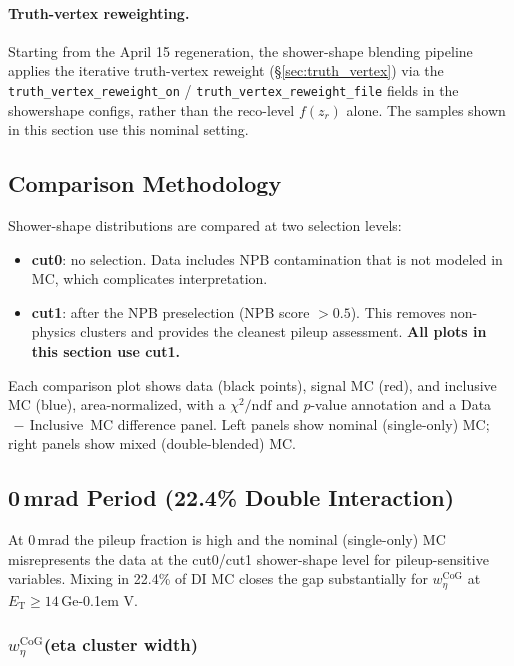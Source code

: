 \documentclass[11pt,a4paper]{article}
\newcommand{\ET}{\ensuremath{E_{\text{T}}}\xspace}
\newcommand{\wetacog}{\ensuremath{w_{\eta}^{\mathrm{CoG}}}\xspace}
\newcommand{\chidf}{\ensuremath{\chi^2/\mathrm{ndf}}\xspace}
\newcommand{\GeV}{\ifmmode {\mathrm{\ Ge\kern -0.1em V}}\else\textrm{Ge\kern -0.1em V}\fi\xspace}
\begin{document}
\paragraph{Truth-vertex reweighting.} Starting from the April 15
regeneration, the shower-shape blending pipeline applies the iterative
truth-vertex reweight (\S\ref{sec:truth_vertex}) via the
\texttt{truth\_vertex\_reweight\_on} / \texttt{truth\_vertex\_reweight\_file}
fields in the showershape configs, rather than the reco-level
$f(z_r)$ alone. The samples shown in this section use this nominal
setting.

\subsection{Comparison Methodology}
\label{subsec:shower_method}

Shower-shape distributions are compared at two selection levels:
\begin{itemize}
\item \textbf{cut0}: no selection. Data includes NPB contamination
  that is not modeled in MC, which complicates interpretation.
\item \textbf{cut1}: after the NPB preselection
  (NPB score $>0.5$). This removes non-physics clusters and provides
  the cleanest pileup assessment. \textbf{All plots in this section
  use cut1.}
\end{itemize}
Each comparison plot shows data (black points), signal MC (red),
and inclusive MC (blue), area-normalized, with a \chidf and $p$-value
annotation and a Data$\,-\,$Inclusive~MC difference panel. Left
panels show nominal (single-only) MC; right panels show mixed
(double-blended) MC.

\subsection{0\,mrad Period (22.4\% Double Interaction)}
\label{subsec:results_0mrad}

At 0\,mrad the pileup fraction is high and the nominal (single-only)
MC misrepresents the data at the cut0/cut1 shower-shape level for
pileup-sensitive variables. Mixing in 22.4\% of DI MC closes the
gap substantially for \wetacog at $\ET\geq 14$\,\GeV.

\subsubsection{\wetacog (eta cluster width)}
\end{document}
